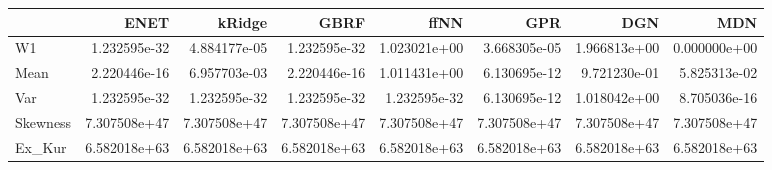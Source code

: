\begin{tabular}{lrrrrrrr}
\toprule
{} &          ENET &        kRidge &          GBRF &          ffNN &           GPR &           DGN &           MDN \\
\midrule
W1       &  1.232595e-32 &  4.884177e-05 &  1.232595e-32 &  1.023021e+00 &  3.668305e-05 &  1.966813e+00 &  0.000000e+00 \\
Mean     &  2.220446e-16 &  6.957703e-03 &  2.220446e-16 &  1.011431e+00 &  6.130695e-12 &  9.721230e-01 &  5.825313e-02 \\
Var      &  1.232595e-32 &  1.232595e-32 &  1.232595e-32 &  1.232595e-32 &  6.130695e-12 &  1.018042e+00 &  8.705036e-16 \\
Skewness &  7.307508e+47 &  7.307508e+47 &  7.307508e+47 &  7.307508e+47 &  7.307508e+47 &  7.307508e+47 &  7.307508e+47 \\
Ex\_Kur   &  6.582018e+63 &  6.582018e+63 &  6.582018e+63 &  6.582018e+63 &  6.582018e+63 &  6.582018e+63 &  6.582018e+63 \\
\bottomrule
\end{tabular}
